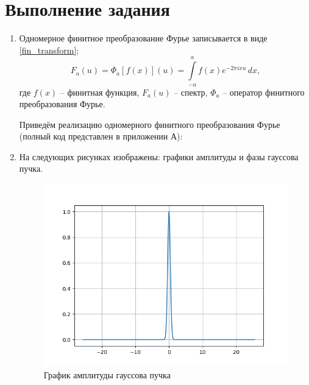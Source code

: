 \section*{Выполнение задания}
{
	\begin{enumerate}
		\item {
			Одномерное финитное преобразование Фурье записывается в виде \eqref{fin_transform};
			\begin{equation}\label{fin_transform}
			F_a(u) = \Phi_a \left[ f(x) \right] (u) = \int\limits_{-a}^{a} f(x) e^{-2 \pi i x u} \,dx,
			\end{equation}
			где $f(x)$ -- финитная функция, $F_a(u)$ -- спектр, $\Phi_a$ -- оператор финитного преобразования Фурье.
			
			Приведём реализацию одномерного финитного преобразования Фурье (полный код представлен в приложении А):
			
		}
		
		\item {
			На следующих рисунках изображены: графики амплитуды и фазы гауссова пучка.
			
			\begin{figure}[H]
				\includegraphics[width=0.75\pagewidth]{Amplitude_gauss}
				\caption{График амплитуды гауссова пучка}
				\label{gauss}
			\end{figure}
		
}
\end{enumerate}}
